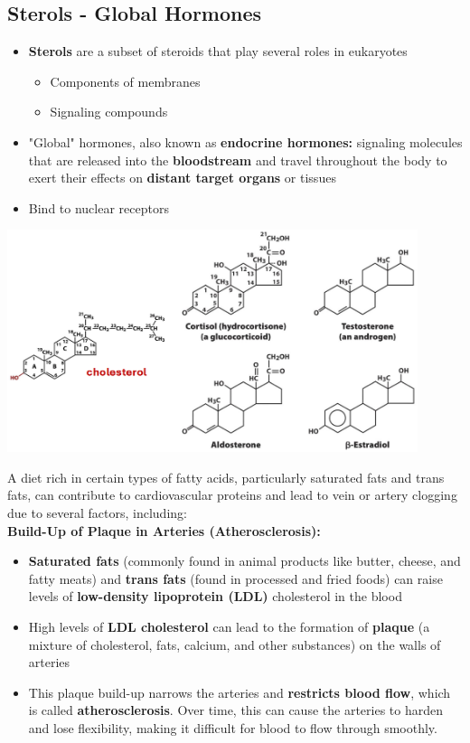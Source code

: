 \documentclass[10pt]{article}
\begin{document}
\subsection*{Sterols - Global Hormones}
\begin{itemize}
    \item \textbf{Sterols} are a subset of steroids that play several roles in eukaryotes
    \begin{itemize}
        \item Components of membranes
        \item Signaling compounds
    \end{itemize}
    \item "Global" hormones, also known as \textbf{endocrine hormones:} signaling molecules that are released into the \textbf{bloodstream} and travel throughout the body to exert their effects on \textbf{distant target organs} or tissues
    \item Bind to nuclear receptors
\end{itemize}
\begin{center}
    \includegraphics*[width=0.9\textwidth]{L2_17.png}
\end{center}
A diet rich in certain types of fatty acids, particularly saturated fats and trans fats, can contribute to cardiovascular proteins and lead to vein or artery clogging due to several factors, including:\\
\textbf{Build-Up of Plaque in Arteries (Atherosclerosis):}
\begin{itemize}
    \item \textbf{Saturated fats} (commonly found in animal products like butter, cheese, and fatty meats) and \textbf{trans fats} (found in processed and fried foods) can raise levels of \textbf{low-density lipoprotein (LDL)} cholesterol in the blood
    \item High levels of \textbf{LDL cholesterol} can lead to the formation of \textbf{plaque} (a mixture of cholesterol, fats, calcium, and other substances) on the walls of arteries
    \item This plaque build-up narrows the arteries and \textbf{restricts blood flow}, which is called \textbf{atherosclerosis}.  Over time, this can cause the arteries to harden and lose flexibility, making it difficult for blood to flow through smoothly.
\end{itemize}
\end{document}
